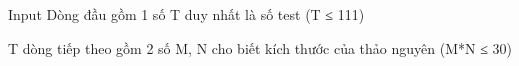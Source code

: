 Input
Dòng đầu gồm 1 số T duy nhất là số test (T ≤ 111)  

   T dòng tiếp theo gồm 2 số M, N cho biết kích thước của thảo nguyên (M*N ≤ 30)